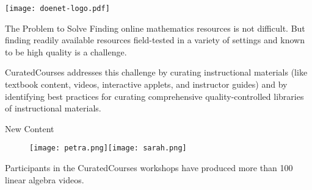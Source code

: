 \vspace{-1.5in}
\texttt{[image: doenet-logo.pdf]}

\begin{sectionblock}{The Problem to Solve}
  Finding online mathematics resources is not difficult.
  But finding readily available resources field-tested in a variety of
  settings and known to be high quality is a challenge.

  \vspace{1ex}CuratedCourses addresses this challenge by curating
  instructional materials (like textbook content, videos, interactive
  applets, and instructor guides) and by identifying best practices
  for curating comprehensive quality-controlled libraries of
  instructional materials.
  
\end{sectionblock}

\vspace{3ex}

\begin{sectionblock}{New Content}
  
\vspace{-1ex}\begin{figure}\null\hfill\texttt{[image: petra.png]}\hfill\texttt{[image: sarah.png]}\hfill\null\end{figure}
Participants in the CuratedCourses workshops have produced more than
100 linear algebra videos.
  
\end{sectionblock}




